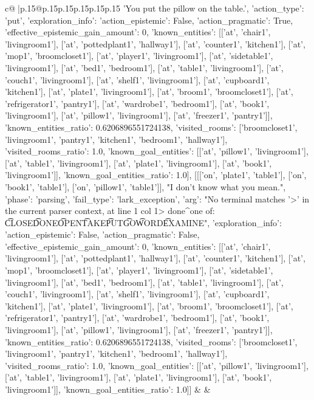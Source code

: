 \documentclass{article}
\begin{document}
{\begin{supertabular}{c@{$\;$}|p{.15\linewidth}@{}p{.15\linewidth}p{.15\linewidth}p{.15\linewidth}p{.15\linewidth}p{.15\linewidth}}
{{{'You put the pillow on the table.', {'action_type': 'put', 'exploration_info': {'action_epistemic': False, 'action_pragmatic': True, 'effective_epistemic_gain_amount': 0, 'known_entities': [['at', 'chair1', 'livingroom1'], ['at', 'pottedplant1', 'hallway1'], ['at', 'counter1', 'kitchen1'], ['at', 'mop1', 'broomcloset1'], ['at', 'player1', 'livingroom1'], ['at', 'sidetable1', 'livingroom1'], ['at', 'bed1', 'bedroom1'], ['at', 'table1', 'livingroom1'], ['at', 'couch1', 'livingroom1'], ['at', 'shelf1', 'livingroom1'], ['at', 'cupboard1', 'kitchen1'], ['at', 'plate1', 'livingroom1'], ['at', 'broom1', 'broomcloset1'], ['at', 'refrigerator1', 'pantry1'], ['at', 'wardrobe1', 'bedroom1'], ['at', 'book1', 'livingroom1'], ['at', 'pillow1', 'livingroom1'], ['at', 'freezer1', 'pantry1']], 'known_entities_ratio': 0.6206896551724138, 'visited_rooms': ['broomcloset1', 'livingroom1', 'pantry1', 'kitchen1', 'bedroom1', 'hallway1'], 'visited_rooms_ratio': 1.0, 'known_goal_entities': [['at', 'pillow1', 'livingroom1'], ['at', 'table1', 'livingroom1'], ['at', 'plate1', 'livingroom1'], ['at', 'book1', 'livingroom1']], 'known_goal_entities_ratio': 1.0}}], [[['on', 'plate1', 'table1'], ['on', 'book1', 'table1'], ['on', 'pillow1', 'table1']], "I don't know what you mean.", {'phase': 'parsing', 'fail_type': 'lark_exception', 'arg': "No terminal matches '>' in the current parser context, at line 1 col 1\n\n> done\n^\nExpected one of: \n\t* CLOSE\n\t* DONE\n\t* OPEN\n\t* TAKE\n\t* PUT\n\t* GO\n\t* WORD\n\t* EXAMINE\n", 'exploration_info': {'action_epistemic': False, 'action_pragmatic': False, 'effective_epistemic_gain_amount': 0, 'known_entities': [['at', 'chair1', 'livingroom1'], ['at', 'pottedplant1', 'hallway1'], ['at', 'counter1', 'kitchen1'], ['at', 'mop1', 'broomcloset1'], ['at', 'player1', 'livingroom1'], ['at', 'sidetable1', 'livingroom1'], ['at', 'bed1', 'bedroom1'], ['at', 'table1', 'livingroom1'], ['at', 'couch1', 'livingroom1'], ['at', 'shelf1', 'livingroom1'], ['at', 'cupboard1', 'kitchen1'], ['at', 'plate1', 'livingroom1'], ['at', 'broom1', 'broomcloset1'], ['at', 'refrigerator1', 'pantry1'], ['at', 'wardrobe1', 'bedroom1'], ['at', 'book1', 'livingroom1'], ['at', 'pillow1', 'livingroom1'], ['at', 'freezer1', 'pantry1']], 'known_entities_ratio': 0.6206896551724138, 'visited_rooms': ['broomcloset1', 'livingroom1', 'pantry1', 'kitchen1', 'bedroom1', 'hallway1'], 'visited_rooms_ratio': 1.0, 'known_goal_entities': [['at', 'pillow1', 'livingroom1'], ['at', 'table1', 'livingroom1'], ['at', 'plate1', 'livingroom1'], ['at', 'book1', 'livingroom1']], 'known_goal_entities_ratio': 1.0}}]] 
	  } 
	   } 
	   } 
	 & & \\ 
 


\end{supertabular}}
\end{document}
